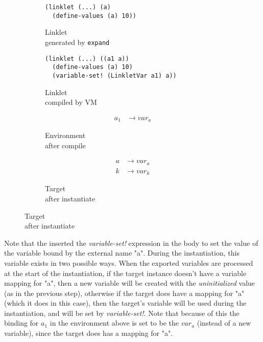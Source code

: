 \begin{figure}[h!]
  \footnotesize
  \begin{subfigure}[b]{0.26\textwidth}
    \begin{mdframed}
\begin{verbatim}
(linklet (...) (a)
  (define-values (a) 10))
\end{verbatim}
    \end{mdframed}
    \caption{Linklet \\ generated by \texttt{expand}}
    \label{fig:1}
  \end{subfigure}
  \begin{subfigure}[b]{0.38\textwidth}
    \begin{mdframed}
\begin{verbatim}
(linklet (...) ((a1 a))
  (define-values (a) 10)
  (variable-set! (LinkletVar a1) a))
\end{verbatim}
    \end{mdframed}
    \caption{Linklet \\ compiled by VM}
    \label{fig:2}
  \end{subfigure} \hfill
  \begin{subfigure}[b]{0.15\textwidth}
    \begin{mdframed}
      \begin{align*}
        a_1 &\rightarrow var_a
      \end{align*}
    \end{mdframed}
    \caption{Environment \\ after compile}
    \label{fig:2}
  \end{subfigure}
  \begin{subfigure}[b]{0.15\textwidth}
    \begin{mdframed}
      \begin{align*}
        a &\rightarrow var_a \\
        k &\rightarrow var_k
      \end{align*}
    \end{mdframed}
    \caption{Target \\ after instantiate}
    \label{fig:2}
  \end{subfigure}
\end{figure}
\vspace{-0.25cm}
Note that the  inserted the \emph{variable-set!}
expression in the body to set the value of the variable bound by the
external name "a". During the instantiation, this variable exists in
two possible ways. When the exported variables are processed at the
start of the instantiation, if the target instance doesn't have a
variable mapping for "a", then a new variable will be created with the
\emph{uninitialized} value (as in the previous step), otherwise if the
target does have a mapping for "a" (which it does in this case), then
the target's variable will be used during the instantiation, and will
be set by \emph{variable-set!}. Note that because of this the binding
for $a_1$ in the environment above is set to be the $var_a$ (instead
of a new variable), since the target does has a mapping for "a".
\vspace{-0.25cm}

